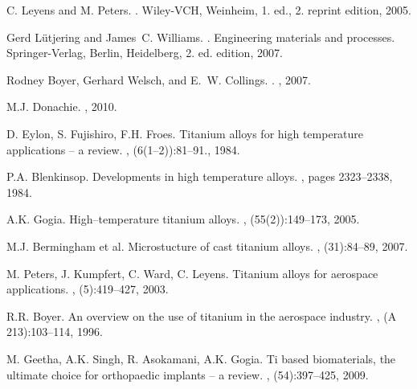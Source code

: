 \begin{thebibliography}{10}

{C. Leyens} and {M. Peters}.
.
\newblock Wiley-VCH, Weinheim, 1. ed., 2. reprint edition, 2005.

Gerd L{\"u}tjering and James~C. Williams.
.
\newblock Engineering materials and processes. Springer-Verlag, Berlin,
  Heidelberg, 2. ed. edition, 2007.

Rodney Boyer, Gerhard Welsch, and E.~W. Collings.
.
, 2007.

{M.J. Donachie}.
, 2010.

{D. Eylon, S. Fujishiro, F.H. Froes}.
\newblock Titanium alloys for high temperature applications -- a review.
, (6(1--2)):81--91.,
  1984.

{P.A. Blenkinsop}.
\newblock Developments in high temperature alloys.
, pages 2323--2338, 1984.

{A.K. Gogia}.
\newblock High--temperature titanium alloys.
, (55(2)):149--173, 2005.

{M.J. Bermingham et al.}
\newblock Microstucture of cast titanium alloys.
, (31):84--89, 2007.

{M. Peters, J. Kumpfert, C. Ward, C. Leyens}.
\newblock Titanium alloys for aerospace applications.
, (5):419--427, 2003.

{R.R. Boyer}.
\newblock An overview on the use of titanium in the aerospace industry.
, (A 213):103--114, 1996.

{M. Geetha, A.K. Singh, R. Asokamani, A.K. Gogia}.
\newblock Ti based biomaterials, the ultimate choice for orthopaedic implants
  -- a review.
, (54):397--425, 2009.


\end{thebibliography}
